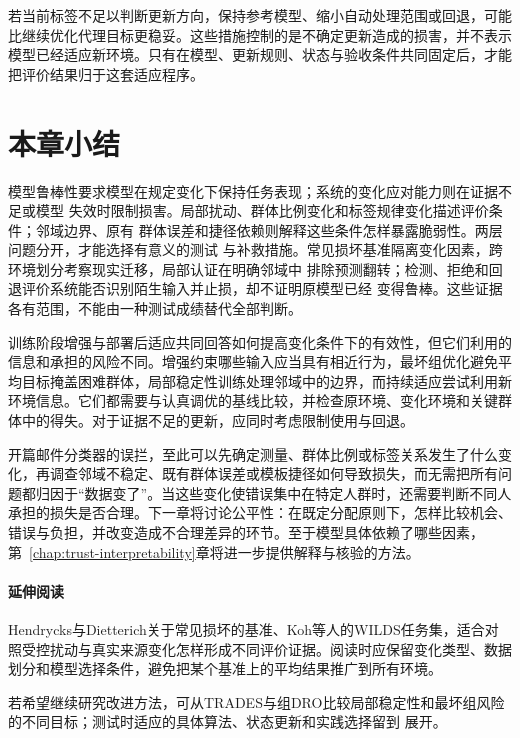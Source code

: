 若当前标签不足以判断更新方向，保持参考模型、缩小自动处理范围或回退，可能比继续优化代理目标更稳妥。这些措施控制的是不确定更新造成的损害，并不表示模型已经适应新环境。只有在模型、更新规则、状态与验收条件共同固定后，才能把评价结果归于这套适应程序。

\section{本章小结}
\label{sec:robustness-summary}

模型鲁棒性要求模型在规定变化下保持任务表现；系统的变化应对能力则在证据不足或模型
失效时限制损害。局部扰动、群体比例变化和标签规律变化描述评价条件；邻域边界、原有
群体误差和捷径依赖则解释这些条件怎样暴露脆弱性。两层问题分开，才能选择有意义的测试
与补救措施。常见损坏基准隔离变化因素，跨环境划分考察现实迁移，局部认证在明确邻域中
排除预测翻转；检测、拒绝和回退评价系统能否识别陌生输入并止损，却不证明原模型已经
变得鲁棒。这些证据各有范围，不能由一种测试成绩替代全部判断。

训练阶段增强与部署后适应共同回答如何提高变化条件下的有效性，但它们利用的信息和承担的风险不同。增强约束哪些输入应当具有相近行为，最坏组优化避免平均目标掩盖困难群体，局部稳定性训练处理邻域中的边界，而持续适应尝试利用新环境信息。它们都需要与认真调优的基线比较，并检查原环境、变化环境和关键群体中的得失。对于证据不足的更新，应同时考虑限制使用与回退。

开篇邮件分类器的误拦，至此可以先确定测量、群体比例或标签关系发生了什么变化，再调查邻域不稳定、既有群体误差或模板捷径如何导致损失，而无需把所有问题都归因于“数据变了”。当这些变化使错误集中在特定人群时，还需要判断不同人承担的损失是否合理。下一章将讨论公平性：在既定分配原则下，怎样比较机会、错误与负担，并改变造成不合理差异的环节。至于模型具体依赖了哪些因素，第~\ref{chap:trust-interpretability}章将进一步提供解释与核验的方法。

\paragraph{延伸阅读}

Hendrycks与Dietterich关于常见损坏的基准、Koh等人的WILDS任务集，适合对照受控扰动与真实来源变化怎样形成不同评价证据。阅读时应保留变化类型、数据划分和模型选择条件，避免把某个基准上的平均结果推广到所有环境。

若希望继续研究改进方法，可从TRADES与组DRO比较局部稳定性和最坏组风险的不同目标；测试时适应的具体算法、状态更新和实践选择留到
展开。
